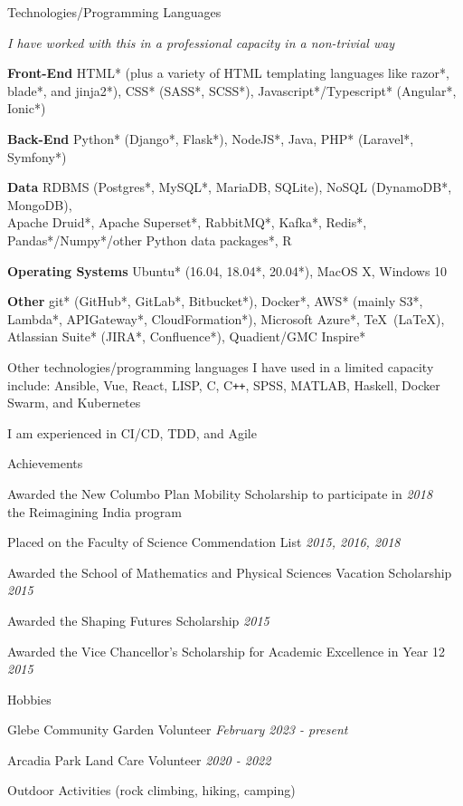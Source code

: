 \documentclass{resume} %
\begin{document}

\begin{rSection}{Technologies/Programming Languages}
    \item {\em * I have worked with this in a professional capacity in a non-trivial way}
    \item {\bf Front-End} HTML* (plus a variety of HTML templating languages like razor*,
    blade*, and jinja2*), CSS* (SASS*, SCSS*), Javascript*/Typescript* (Angular*, Ionic*)
    \item {\bf Back-End} Python* (Django*, Flask*), NodeJS*, Java, PHP* (Laravel*, Symfony*)
    \item {\bf Data} RDBMS (Postgres*, MySQL*, MariaDB, SQLite), NoSQL (DynamoDB*, MongoDB),
    \\ Apache Druid*, Apache Superset*, RabbitMQ*, Kafka*, Redis*, Pandas*/Numpy*/other Python data packages*, R
    \item {\bf Operating Systems} Ubuntu* (16.04, 18.04*, 20.04*), MacOS X, Windows 10
    \item {\bf Other} git* (GitHub*, GitLab*, Bitbucket*), Docker*, AWS* (mainly S3*, Lambda*, APIGateway*, CloudFormation*), Microsoft Azure*,
    \TeX\ (\LaTeX), Atlassian Suite* (JIRA*, Confluence*), Quadient/GMC Inspire*
    \item Other technologies/programming languages I have used in a limited capacity include:
    Ansible, Vue, React, LISP, C, C\texttt{++}, SPSS, MATLAB, Haskell, Docker Swarm, and Kubernetes
    \item I am experienced in CI/CD, TDD, and Agile
\end{rSection}


\begin{rSection}{Achievements}
    \item Awarded the New Columbo Plan Mobility Scholarship to participate in \hfill {\em 2018}
    \\ the Reimagining India program
    \item Placed on the Faculty of Science Commendation List \hfill {\em 2015, 2016, 2018}
    \item Awarded the School of Mathematics and Physical Sciences Vacation Scholarship
    \hfill {\em 2015}
    \item Awarded the Shaping Futures Scholarship \hfill {\em 2015} \
    \item Awarded the Vice Chancellor's Scholarship for Academic Excellence in Year 12 \hfill {\em 2015}
\end{rSection}

\begin{rSection}{Hobbies}
    \item Glebe Community Garden Volunteer \hfill {\em February 2023 - present}
    \item Arcadia Park Land Care Volunteer \hfill {\em 2020 - 2022}
    \item Outdoor Activities (rock climbing, hiking, camping)
\end{rSection}
\end{document}
